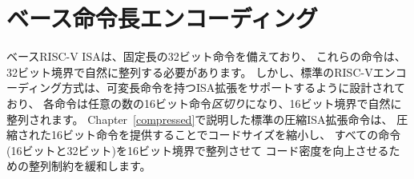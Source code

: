 \begin{comment}
\section{Base Instruction-Length Encoding}

The base RISC-V ISA has fixed-length 32-bit instructions that must be
naturally aligned on 32-bit boundaries.  However, the standard RISC-V
encoding scheme is designed to support ISA extensions with
variable-length instructions, where each instruction can be any number
of 16-bit instruction {\em parcels} in length and parcels are
naturally aligned on 16-bit boundaries.  The standard compressed ISA
extension described in Chapter~\ref{compressed} reduces code size by
providing compressed 16-bit instructions and relaxes the alignment
constraints to allow all instructions (16 bit and 32 bit) to be
aligned on any 16-bit boundary to improve code density.

We use the term IALIGN (measured in bits) to refer to the instruction-address
alignment constraint the implementation enforces.  IALIGN is 32 bits in the
base ISA, but some ISA extensions, including the compressed ISA extension,
relax IALIGN to 16 bits.  IALIGN may not take on any value other than 16 or
32.

We use the term ILEN (measured in bits) to refer to the maximum
instruction length supported by an implementation, and which is always
a multiple of IALIGN.  For implementations supporting only a base
instruction set, ILEN is 32 bits.  Implementations supporting longer
instructions have larger values of ILEN.

Figure~\ref{instlengthcode} illustrates the standard RISC-V
instruction-length encoding convention.  All the 32-bit instructions
in the base ISA have their lowest two bits set to {\tt 11}.  The
optional compressed 16-bit instruction-set extensions have their
lowest two bits equal to {\tt 00}, {\tt 01}, or {\tt 10}.
\end{comment}

\section{ベース命令長エンコーディング}

ベースRISC-V ISAは、固定長の32ビット命令を備えており、
これらの命令は、32ビット境界で自然に整列する必要があります。
しかし、標準のRISC-Vエンコーディング方式は、可変長命令を持つISA拡張をサポートするように設計されており、
各命令は任意の数の16ビット命令{\em 区切り}になり、16ビット境界で自然に整列されます。
Chapter~\ref{compressed}で説明した標準の圧縮ISA拡張命令は、
圧縮された16ビット命令を提供することでコードサイズを縮小し、
すべての命令(16ビットと32ビット)を16ビット境界で整列させて
コード密度を向上させるための整列制約を緩和します。

